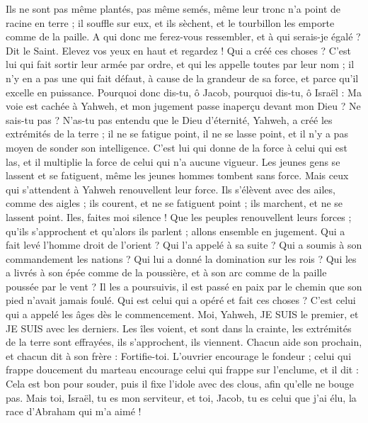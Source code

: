 \begin{multicols}{2}
Ils ne sont pas même plantés, pas même semés, même leur tronc n'a point de racine en terre ; il souffle sur eux, et ils sèchent, et le tourbillon les emporte comme de la paille.
A qui donc me ferez-vous ressembler, et à qui serais-je égalé ? Dit le Saint.
Elevez vos yeux en haut et regardez ! Qui a créé ces choses ? C'est lui qui fait sortir leur armée par ordre, et qui les appelle toutes par leur nom ; il n'y en a pas une qui fait défaut, à cause de la grandeur de sa force, et parce qu'il excelle en puissance.
Pourquoi donc dis-tu, ô Jacob, pourquoi dis-tu, ô Israël : Ma voie est cachée à Yahweh, et mon jugement passe inaperçu devant mon Dieu ?
Ne sais-tu pas ? N'as-tu pas entendu que le Dieu d'éternité, Yahweh, a créé les extrémités de la terre ; il ne se fatigue point, il ne se lasse point, et il n'y a pas moyen de sonder son intelligence.
C'est lui qui donne de la force à celui qui est las, et il multiplie la force de celui qui n'a aucune vigueur.
Les jeunes gens se lassent et se fatiguent, même les jeunes hommes tombent sans force.
Mais ceux qui s'attendent à Yahweh renouvellent leur force. Ils s'élèvent avec des ailes, comme des aigles ; ils courent, et ne se fatiguent point ; ils marchent, et ne se lassent point.
\VerseOne{}Iles, faites moi silence ! Que les peuples renouvellent leurs forces ; qu'ils s'approchent et qu'alors ils parlent ; allons ensemble en jugement.
Qui a fait levé l'homme droit de l'orient ? Qui l'a appelé à sa suite ? Qui a soumis à son commandement les nations ? Qui lui a donné la domination sur les rois ? Qui les a livrés à son épée comme de la poussière, et à son arc comme de la paille poussée par le vent ?
Il les a poursuivis, il est passé en paix par le chemin que son pied n'avait jamais foulé.
Qui est celui qui a opéré et fait ces choses ? C'est celui qui a appelé les âges dès le commencement. Moi, Yahweh, JE SUIS le premier, et JE SUIS avec les derniers.
Les îles voient, et sont dans la crainte, les extrémités de la terre sont effrayées, ils s'approchent, ils viennent.
Chacun aide son prochain, et chacun dit à son frère : Fortifie-toi.
L'ouvrier encourage le fondeur ; celui qui frappe doucement du marteau encourage celui qui frappe sur l'enclume, et il dit : Cela est bon pour souder, puis il fixe l'idole avec des clous, afin qu'elle ne bouge pas.
Mais toi, Israël, tu es mon serviteur, et toi, Jacob, tu es celui que j'ai élu, la race d'Abraham qui m'a aimé !

\end{multicols}
